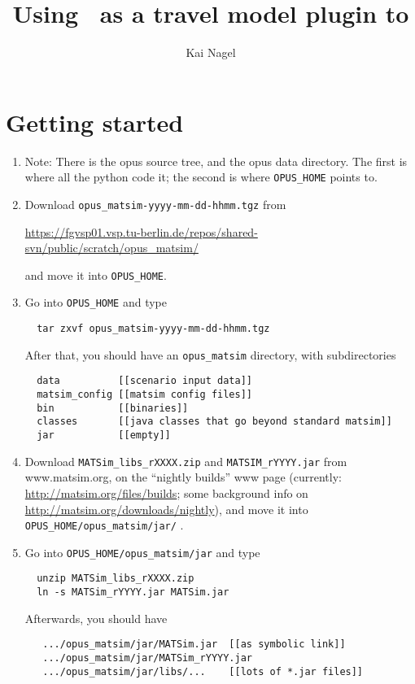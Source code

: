 \documentclass{article}
\title{Using \matsim\ as a travel model plugin to \urbansim}
\author{Kai Nagel}
\begin{document}

\maketitle

\section{Getting started}

\begin{enumerate}

\item Note: There is the opus source tree, and the opus data directory.
The first is where all the python code it; the second is where
\verb#OPUS_HOME# points to.

\item Download \verb#opus_matsim-yyyy-mm-dd-hhmm.tgz# from

\url{https://fgvsp01.vsp.tu-berlin.de/repos/shared-svn/public/scratch/opus_matsim/}

and move it into \verb#OPUS_HOME#.

\item Go into \verb#OPUS_HOME# and type
\begin{verbatim}
  tar zxvf opus_matsim-yyyy-mm-dd-hhmm.tgz
\end{verbatim}

After that, you should have an \verb$opus_matsim$ directory, with
subdirectories
\begin{verbatim}
  data          [[scenario input data]]
  matsim_config [[matsim config files]]
  bin           [[binaries]]
  classes       [[java classes that go beyond standard matsim]]
  jar           [[empty]]
\end{verbatim}

\item Download \verb$MATSim_libs_rXXXX.zip$ and
\verb$MATSIM_rYYYY.jar$ from www.matsim.org, on the ``nightly builds''
www page (currently: \url{http://matsim.org/files/builds}; some
background info on \url{http://matsim.org/downloads/nightly}), and
move it into \verb$OPUS_HOME/opus_matsim/jar/$ .

\item Go into \verb$OPUS_HOME/opus_matsim/jar$ and type
\begin{verbatim}
  unzip MATSim_libs_rXXXX.zip
  ln -s MATSim_rYYYY.jar MATSim.jar
\end{verbatim}
Afterwards, you should have
\begin{verbatim}
   .../opus_matsim/jar/MATSim.jar  [[as symbolic link]]
   .../opus_matsim/jar/MATSim_rYYYY.jar
   .../opus_matsim/jar/libs/...    [[lots of *.jar files]]
\end{verbatim}


\end{enumerate}
\end{document}
